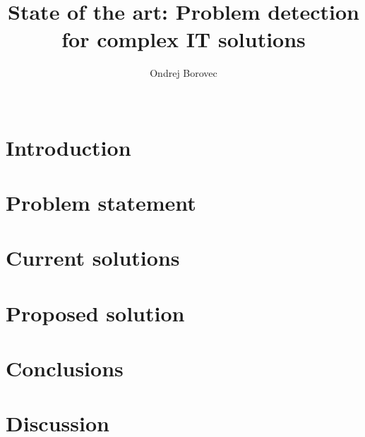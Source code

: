 \documentclass{vldb}
\begin{document}
\title{State of the art: Problem detection for complex IT solutions}

\author{
\alignauthor Ondrej Borovec
       \\
       \\
}

\maketitle

\begin{abstract}

\end{abstract}




\section{Introduction}


\section{Problem statement} \label{sec:problemStatement}


\section{Current solutions} \label{sec:currentSolution}


\section{Proposed solution} \label{sec:proposedSolution}


\section{Conclusions} \label{sec:conclusion}

\section{Discussion} \label{sec:discussion}


  
\end{document}

